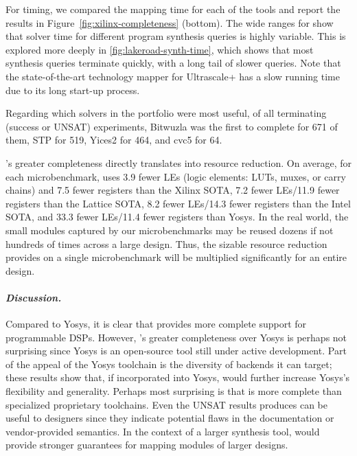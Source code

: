 For timing, we compared the mapping time for each
  of the tools
  and report the results
  in Figure~\ref{fig:xilinx-completeness} (bottom).
The wide ranges for \lr
  show that solver time for different
  program synthesis queries
  is highly variable.
This is explored more deeply in
  \cref{fig:lakeroad-synth-time},
  which shows that most synthesis queries
  terminate quickly,
  with a long tail of slower queries.
Note that the state-of-the-art technology
mapper for Ultrascale+ has a slow running time
  due to its long start-up process.\tighten

Regarding which solvers
  in the portfolio were
  most useful,
  of all terminating
  (success or UNSAT)
  \lr experiments,
  Bitwuzla was the first
  to complete
  for 671 of them,
  STP for 519,
  Yices2 for 464,
  and cvc5 for 64.

\lr's greater completeness
  directly translates into resource reduction.
On average, for each microbenchmark,
  \lr uses 3.9 fewer LEs
  (logic elements: LUTs, muxes, or carry chains)
  and 7.5 fewer registers than the Xilinx SOTA,
  7.2 fewer LEs/11.9 fewer registers than the Lattice SOTA,
  8.2 fewer LEs/14.3 fewer registers than the Intel SOTA,
  and 33.3 fewer LEs/11.4 fewer registers than Yosys. 
In the real world, the small modules
  captured by our microbenchmarks
  may be reused dozens
  if not hundreds of times
  across a large design.
Thus, the sizable resource
  reduction \lr provides on a single
  microbenchmark
  will be multiplied significantly
  for an entire design.\tighten


\paragraph{\textnormal{\textit{\textbf{Discussion.}}}}
Compared to Yosys,
  it is clear that
  \lr provides more complete support
  for
  programmable DSPs.
However, \lr's greater completeness
  over Yosys
  is perhaps not surprising since 
  Yosys is an open-source tool
  still under active development.
Part of the appeal
  of the Yosys toolchain
  is the diversity of backends
  it can target;
  these results show that, if incorporated
  into Yosys, \lr
  would further increase
  Yosys's flexibility and generality.
Perhaps most surprising
  is that \lr is more complete
  than
  specialized proprietary toolchains. 
Even the UNSAT results \lr produces 
  can be useful to designers 
  since they indicate
  potential flaws
  in the documentation or vendor-provided semantics.
In the context of a larger
  synthesis tool, \lr
  would provide stronger
  guarantees for mapping
  modules of larger designs.






